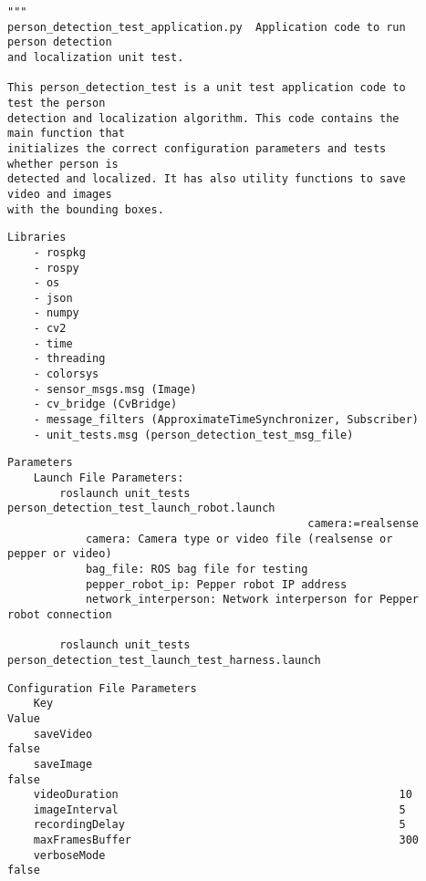 \documentclass{CSSRforAfrica}
\newcommand{\checkboxChecked}{\fbox{\ding{51}}} %
\begin{document}
\begin{description}

\item[\checkboxChecked] 
 {\small 
\begin{verbatim}
"""
person_detection_test_application.py  Application code to run person detection 
and localization unit test.

This person_detection_test is a unit test application code to test the person 
detection and localization algorithm. This code contains the main function that 
initializes the correct configuration parameters and tests whether person is 
detected and localized. It has also utility functions to save video and images 
with the bounding boxes. 
\end{verbatim}}

\item[\checkboxChecked] 
 {\small 
\begin{verbatim}
Libraries
    - rospkg
    - rospy
    - os
    - json
    - numpy
    - cv2
    - time
    - threading
    - colorsys
    - sensor_msgs.msg (Image)
    - cv_bridge (CvBridge)
    - message_filters (ApproximateTimeSynchronizer, Subscriber)
    - unit_tests.msg (person_detection_test_msg_file)
\end{verbatim}}

\newpage
\item[\checkboxChecked] 
 {\small 
\begin{verbatim}
Parameters
    Launch File Parameters:
        roslaunch unit_tests person_detection_test_launch_robot.launch 
                                              camera:=realsense
            camera: Camera type or video file (realsense or pepper or video)
            bag_file: ROS bag file for testing 
            pepper_robot_ip: Pepper robot IP address
            network_interperson: Network interperson for Pepper robot connection

        roslaunch unit_tests person_detection_test_launch_test_harness.launch
\end{verbatim}}

\item[\checkboxChecked] 
 {\small 
\begin{verbatim}
Configuration File Parameters
    Key                                                     Value
    saveVideo                                               false
    saveImage                                               false
    videoDuration                                           10
    imageInterval                                           5
    recordingDelay                                          5
    maxFramesBuffer                                         300
    verboseMode                                             false
\end{verbatim}}


\end{description}
\end{document}
